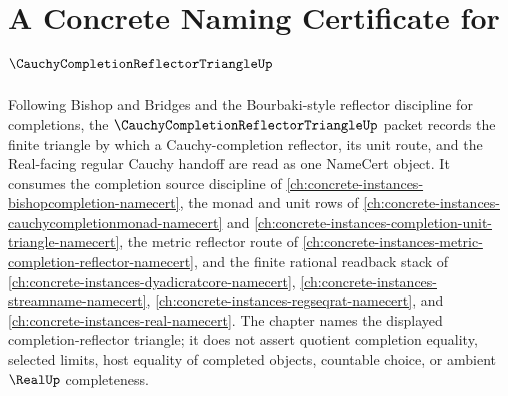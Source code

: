 \chapter{A Concrete Naming Certificate for $\CauchyCompletionReflectorTriangleUp$}
\label{ch:concrete-instances-cauchy-completion-reflector-triangle-namecert}

Following Bishop and Bridges and the Bourbaki-style reflector discipline for completions, the $\CauchyCompletionReflectorTriangleUp$ packet records the finite triangle by which a Cauchy-completion reflector, its unit route, and the Real-facing regular Cauchy handoff are read as one NameCert object. It consumes the completion source discipline of \autoref{ch:concrete-instances-bishopcompletion-namecert}, the monad and unit rows of \autoref{ch:concrete-instances-cauchycompletionmonad-namecert} and \autoref{ch:concrete-instances-completion-unit-triangle-namecert}, the metric reflector route of \autoref{ch:concrete-instances-metric-completion-reflector-namecert}, and the finite rational readback stack of \autoref{ch:concrete-instances-dyadicratcore-namecert}, \autoref{ch:concrete-instances-streamname-namecert}, \autoref{ch:concrete-instances-regseqrat-namecert}, and \autoref{ch:concrete-instances-real-namecert}. The chapter names the displayed completion-reflector triangle; it does not assert quotient completion equality, selected limits, host equality of completed objects, countable choice, or ambient $\RealUp$ completeness.

